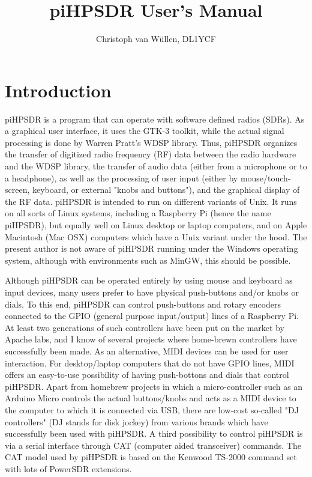 \documentclass[12pt]{book}
\begin{document}
\title{
piHPSDR User's Manual
}
\author{
Christoph van W\"ullen, DL1YCF
}
%
\maketitle
\tableofcontents
\chapter{Introduction}
piHPSDR is a program that can operate with software defined radios (SDRs). As a graphical user interface,
it uses the GTK-3 toolkit, while the actual signal processing is done by Warren Pratt's WDSP library. Thus,
piHPSDR organizes the transfer of digitized radio frequency (RF) data between the radio hardware and the WDSP library, the
transfer of audio data (either from a microphone or to a headphone), as well as the processing of user
input (either by mouse/touch-screen, keyboard, or external "knobs and buttons"),
 and the graphical display of the RF data. piHPSDR is intended
to run on different variants of Unix. It runs on all sorts of Linux systems, including a Raspberry Pi (hence
the name piHPSDR), but equally well on Linux desktop or laptop computers, and on Apple Macintosh (Mac OSX)
computers which have a Unix variant under the hood. The present author is not aware of piHPSDR running
under the Windows operating system, although with environments such as MinGW, this should be possible.

Although piHPSDR can be operated entirely by using mouse and keyboard as input devices, many users prefer to
have physical push-buttons and/or knobs or dials. To this end, piHPSDR can control push-buttons and rotary
encoders connected to the GPIO (general purpose input/output)
lines of a Raspberry Pi. At least two generations of such controllers have
been put on the market by Apache labs, and I know of several projects where home-brewn controllers have
successfully been made. As an alternative, MIDI devices can be used for user interaction. For desktop/laptop
computers that do not have GPIO lines, MIDI offers an easy-to-use possibility of having push-bottons and
dials that control piHPSDR. Apart from homebrew projects in which a micro-controller such as an Arduino Micro
controls the actual buttons/knobs and acts as a MIDI device to the computer to which it is connected via USB,
there are low-cost so-called "DJ controllers" (DJ stands for disk jockey) from various brands which have
successfully been used with piHPSDR. A third possibility to control piHPSDR is via a serial interface
through CAT (computer aided transceiver) commands. The CAT model used by piHPSDR is based on the Kenwood
TS-2000 command set with lots of PowerSDR extensions.
\end{document}
